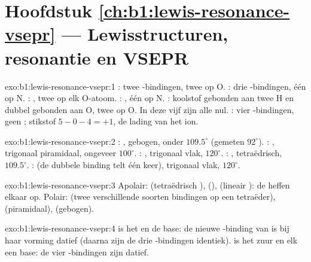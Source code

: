\section*{Hoofdstuk \ref{ch:b1:lewis-resonance-vsepr} --- Lewisstructuren, resonantie en VSEPR}

\begin{solution}{exo:b1:lewis-resonance-vsepr:1}
: twee -bindingen, twee  op O. : drie
-bindingen, één  op N. : , twee  op elk O-atoom. : , één  op N.
: koolstof gebonden aan twee H en dubbel gebonden aan O, twee
 op O. In deze vijf zijn alle  nul.
: vier -bindingen, geen ; stikstof
$5 - 0 - 4 = +1$, de lading van het ion.
\end{solution}

\begin{solution}{exo:b1:lewis-resonance-vsepr:2}
: , gebogen, onder $109.5^\circ$ (gemeten $92^\circ$).
: , trigonaal piramidaal, ongeveer $100^\circ$.
: , trigonaal vlak, $120^\circ$. : ,
tetraëdrisch, $109.5^\circ$. :  (de dubbele binding
telt één keer), trigonaal vlak, $120^\circ$.
\end{solution}

\begin{solution}{exo:b1:lewis-resonance-vsepr:3}
Apolair:  (tetraëdrisch ),  (),
 (lineair ): de  heffen elkaar op. Polair:
 (twee verschillende soorten bindingen op een tetraëder),
 (piramidaal),  (gebogen).
\end{solution}

\begin{solution}{exo:b1:lewis-resonance-vsepr:4}
 is het  en  de base: de nieuwe -binding
van  is bij haar vorming datief (daarna zijn de drie
-bindingen identiek).  is het zuur en elk 
een base: de vier -bindingen zijn datief.
\end{solution}

